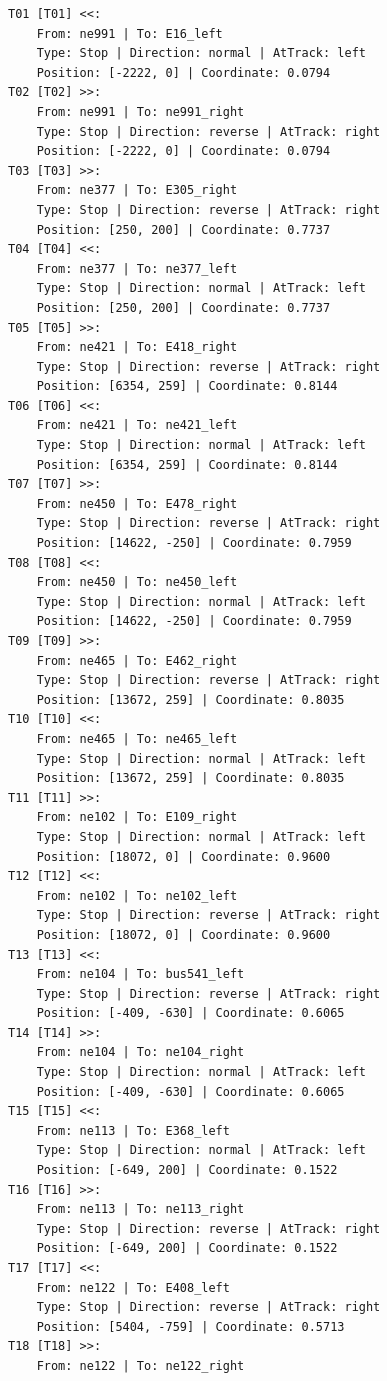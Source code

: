 	\begin{lstlisting}[language = {}, tabsize=4, basicstyle=\footnotesize\ttfamily, showspaces=false, showstringspaces=false, caption = Signalling.RNA, label = {lst:EJ4_6}]
T01 [T01] <<:
	From: ne991 | To: E16_left
	Type: Stop | Direction: normal | AtTrack: left 
	Position: [-2222, 0] | Coordinate: 0.0794
T02 [T02] >>:
	From: ne991 | To: ne991_right
	Type: Stop | Direction: reverse | AtTrack: right 
	Position: [-2222, 0] | Coordinate: 0.0794
T03 [T03] >>:
	From: ne377 | To: E305_right
	Type: Stop | Direction: reverse | AtTrack: right 
	Position: [250, 200] | Coordinate: 0.7737
T04 [T04] <<:
	From: ne377 | To: ne377_left
	Type: Stop | Direction: normal | AtTrack: left 
	Position: [250, 200] | Coordinate: 0.7737
T05 [T05] >>:
	From: ne421 | To: E418_right
	Type: Stop | Direction: reverse | AtTrack: right 
	Position: [6354, 259] | Coordinate: 0.8144
T06 [T06] <<:
	From: ne421 | To: ne421_left
	Type: Stop | Direction: normal | AtTrack: left 
	Position: [6354, 259] | Coordinate: 0.8144
T07 [T07] >>:
	From: ne450 | To: E478_right
	Type: Stop | Direction: reverse | AtTrack: right 
	Position: [14622, -250] | Coordinate: 0.7959
T08 [T08] <<:
	From: ne450 | To: ne450_left
	Type: Stop | Direction: normal | AtTrack: left 
	Position: [14622, -250] | Coordinate: 0.7959
T09 [T09] >>:
	From: ne465 | To: E462_right
	Type: Stop | Direction: reverse | AtTrack: right 
	Position: [13672, 259] | Coordinate: 0.8035
T10 [T10] <<:
	From: ne465 | To: ne465_left
	Type: Stop | Direction: normal | AtTrack: left 
	Position: [13672, 259] | Coordinate: 0.8035
T11 [T11] >>:
	From: ne102 | To: E109_right
	Type: Stop | Direction: normal | AtTrack: left 
	Position: [18072, 0] | Coordinate: 0.9600
T12 [T12] <<:
	From: ne102 | To: ne102_left
	Type: Stop | Direction: reverse | AtTrack: right 
	Position: [18072, 0] | Coordinate: 0.9600
T13 [T13] <<:
	From: ne104 | To: bus541_left
	Type: Stop | Direction: reverse | AtTrack: right 
	Position: [-409, -630] | Coordinate: 0.6065
T14 [T14] >>:
	From: ne104 | To: ne104_right
	Type: Stop | Direction: normal | AtTrack: left 
	Position: [-409, -630] | Coordinate: 0.6065
T15 [T15] <<:
	From: ne113 | To: E368_left
	Type: Stop | Direction: normal | AtTrack: left 
	Position: [-649, 200] | Coordinate: 0.1522
T16 [T16] >>:
	From: ne113 | To: ne113_right
	Type: Stop | Direction: reverse | AtTrack: right 
	Position: [-649, 200] | Coordinate: 0.1522
T17 [T17] <<:
	From: ne122 | To: E408_left
	Type: Stop | Direction: reverse | AtTrack: right 
	Position: [5404, -759] | Coordinate: 0.5713
T18 [T18] >>:
	From: ne122 | To: ne122_right

\end{lstlisting}
